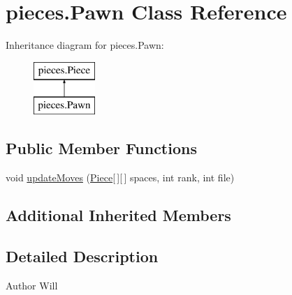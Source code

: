 \hypertarget{classpieces_1_1_pawn}{\section{pieces.\-Pawn Class Reference}
\label{classpieces_1_1_pawn}
}
Inheritance diagram for pieces.\-Pawn\-:\begin{figure}[H]
\begin{center}
\leavevmode
\includegraphics[height=2.000000cm]{classpieces_1_1_pawn}
\end{center}
\end{figure}
\subsection*{Public Member Functions}
\begin{DoxyCompactItemize}
\item 
void \hyperlink{classpieces_1_1_pawn_ad171a4c5739fb3ca9c5832d3252679b0}{update\-Moves} (\hyperlink{classpieces_1_1_piece}{Piece}\mbox{[}$\,$\mbox{]}\mbox{[}$\,$\mbox{]} spaces, int rank, int file)
\end{DoxyCompactItemize}
\subsection*{Additional Inherited Members}


\subsection{Detailed Description}
\begin{DoxyAuthor}{Author}
Will 
\end{DoxyAuthor}


